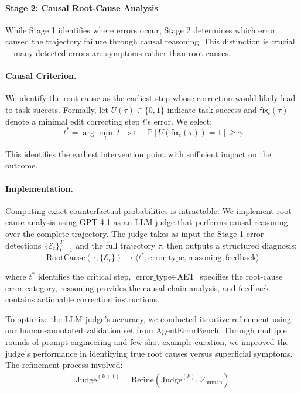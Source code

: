 \paragraph{Stage 2: Causal Root-Cause Analysis}

While Stage 1 identifies where errors occur, Stage 2 determines which error caused the trajectory failure through causal reasoning. This distinction is crucial—many detected errors are symptoms rather than root causes.

\paragraph{Causal Criterion.} We identify the root cause as the earliest step whose correction would likely lead to task success. Formally, let $U(\tau) \in \{0,1\}$ indicate task success and $\mathsf{fix}_t(\tau)$ denote a minimal edit correcting step $t$'s error. We select:
$$t^* = \arg\min_t \; t \quad \text{s.t.} \quad \mathbb{P}[U(\mathsf{fix}_t(\tau)) = 1] \geq \gamma$$

This identifies the earliest intervention point with sufficient impact on the outcome.

\paragraph{Implementation.} Computing exact counterfactual probabilities is intractable. We implement root-cause analysis using GPT-4.1 as an LLM judge that performs causal reasoning over the complete trajectory. The judge takes as input the Stage 1 error detections $\{\mathcal{E}_t\}_{t=1}^T$ and the full trajectory $\tau$, then outputs a structured diagnosis:
$$\text{RootCause}(\tau, \{\mathcal{E}_t\}) \rightarrow \langle t^*, \text{error\_type}, \text{reasoning}, \text{feedback} \rangle$$

where $t^*$ identifies the critical step, $\text{error\_type} \in \text{AET}$ specifies the root-cause error category, $\text{reasoning}$ provides the causal chain analysis, and $\text{feedback}$ contains actionable correction instructions.

To optimize the LLM judge's accuracy, we conducted iterative refinement using our human-annotated validation set from AgentErrorBench. Through multiple rounds of prompt engineering and few-shot example curation, we improved the judge's performance in identifying true root causes versus superficial symptoms. The refinement process involved:
\begin{align}
\text{Judge}^{(k+1)} = \text{Refine}(\text{Judge}^{(k)}, \mathcal{V}_{\text{human}})
\end{align}

